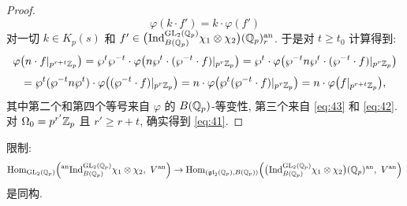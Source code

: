 \begin{proof}
\[
\varphi(k \cdot f') = k \cdot \varphi(f')
\]
对一切 $k \in K_p(s)$ 和 $f' \in \bigl(\prescript{}{}{\mathrm{Ind}}_{B(\mathbb{Q}_p)}^{\mathrm{GL}_2(\mathbb{Q}_p)} \chi_1 \otimes \chi_2\bigr)(\mathbb{Q}_p)^{\mathrm{an}}_{r}$.
于是对 $t \ge t_0$ 计算得到:
\begin{equation}
\label{eq:43}
\varphi\bigl(n \cdot f|_{p^{r+t}\mathbb{Z}_p}\bigr)
= \wp^{t}\wp^{-t} \cdot \varphi\bigl(n\wp^{t} \cdot (\wp^{-t} \cdot f)|_{p^{r}\mathbb{Z}_p}\bigr)
= \wp^{t} \cdot \varphi\bigl(\wp^{-t}n\wp^{t} \cdot (\wp^{-t} \cdot f)|_{p^{r}\mathbb{Z}_p}\bigr)
\end{equation}
\[
= \wp^{t}(\wp^{-t}n\wp^{t}) \cdot \varphi\bigl((\wp^{-t} \cdot f)|_{p^{r}\mathbb{Z}_p}\bigr)
= n \cdot \varphi\bigl(\wp^{t}(\wp^{-t} \cdot f)|_{p^{r}\mathbb{Z}_p}\bigr)
= n \cdot \varphi\bigl(f|_{p^{r+t}\mathbb{Z}_p}\bigr),
\]
其中第二个和第四个等号来自 $\varphi$ 的 $B(\mathbb{Q}_p)$-等变性, 第三个来自 \eqref{eq:43} 和 \eqref{eq:42}.
对 $\Omega_0 = p^{r'}\mathbb{Z}_p$ 且 $r' \ge r + t$, 确实得到 \eqref{eq:41}.
\end{proof}

\begin{lemma}\label{lem:A.2.4}
限制:
\begin{equation}
\label{eq:44}
\Hom_{\GL_2(\Qp)}\Bigl(\anind_{B(\Qp)}^{\GL_2(\Qp)} \chi_1 \otimes \chi_2,\ V^{\mathrm{an}}\Bigr)
\to \Hom_{(\mathfrak{gl}_2(\Qp),B(\Qp))}\Bigl(\bigl(\pind{}_{B(\Qp)}^{\GL_2(\Qp)} \chi_1 \otimes \chi_2\bigr)(\Qp)^{\mathrm{an}},\ V^{\mathrm{an}}\Bigr)
\end{equation}
是同构.
\end{lemma}

